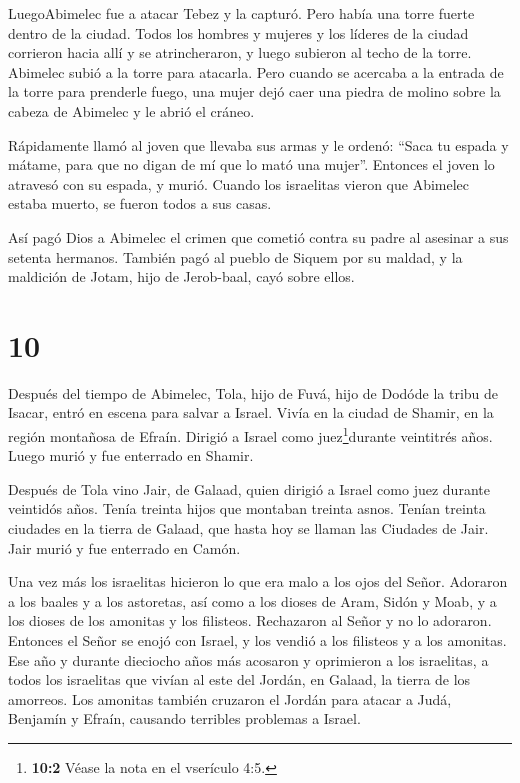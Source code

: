  LuegoAbimelec fue a atacar Tebez y la capturó.
 Pero había una torre fuerte dentro de la ciudad. Todos los
hombres y mujeres y los líderes de la ciudad corrieron hacia allí y se
atrincheraron, y luego subieron al techo de la torre. 
Abimelec subió a la torre para atacarla. Pero cuando se acercaba a la
entrada de la torre para prenderle fuego,  una mujer dejó
caer una piedra de molino sobre la cabeza de Abimelec y le abrió el
cráneo.

 Rápidamente llamó al joven que llevaba sus armas y le
ordenó: ``Saca tu espada y mátame, para que no digan de mí que lo mató
una mujer''. Entonces el joven lo atravesó con su espada, y murió.
 Cuando los israelitas vieron que Abimelec estaba muerto,
se fueron todos a sus casas.

 Así pagó Dios a Abimelec el crimen que cometió contra su
padre al asesinar a sus setenta hermanos.  También pagó al
pueblo de Siquem por su maldad, y la maldición de Jotam, hijo de
Jerob-baal, cayó sobre ellos.

\hypertarget{section-9}{%
\section{10}\label{section-9}}

 Después del tiempo de Abimelec, Tola, hijo de Fuvá, hijo de
Dodóde la tribu de Isacar, entró en escena para salvar a Israel. Vivía
en la ciudad de Shamir, en la región montañosa de Efraín. 
Dirigió a Israel como juez\footnote{\textbf{10:2} Véase la nota en el
  vserículo 4:5.}durante veintitrés años. Luego murió y fue enterrado en
Shamir.

 Después de Tola vino Jair, de Galaad, quien dirigió a
Israel como juez durante veintidós años.  Tenía treinta
hijos que montaban treinta asnos. Tenían treinta ciudades en la tierra
de Galaad, que hasta hoy se llaman las Ciudades de Jair. 
Jair murió y fue enterrado en Camón.

 Una vez más los israelitas hicieron lo que era malo a los
ojos del Señor. Adoraron a los baales y a los astoretas, así como a los
dioses de Aram, Sidón y Moab, y a los dioses de los amonitas y los
filisteos. Rechazaron al Señor y no lo adoraron.  Entonces
el Señor se enojó con Israel, y los vendió a los filisteos y a los
amonitas.  Ese año y durante dieciocho años más acosaron y
oprimieron a los israelitas, a todos los israelitas que vivían al este
del Jordán, en Galaad, la tierra de los amorreos.  Los
amonitas también cruzaron el Jordán para atacar a Judá, Benjamín y
Efraín, causando terribles problemas a Israel.

